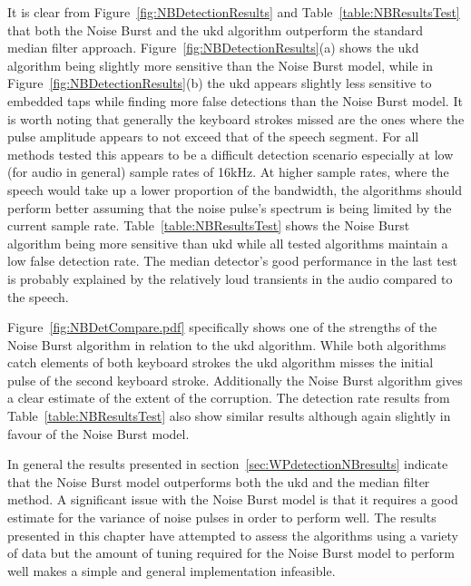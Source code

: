 It is clear from Figure~\ref{fig:NBDetectionResults} and Table~\ref{table:NBResultsTest} that both the Noise Burst and the \gls{ukd} algorithm outperform the standard median filter approach. Figure~\ref{fig:NBDetectionResults}(a) shows the \gls{ukd} algorithm being slightly more sensitive than the Noise Burst model, while in Figure~\ref{fig:NBDetectionResults}(b) the \gls{ukd} appears slightly less sensitive to embedded taps while finding more false detections than the Noise Burst model. It is worth noting that generally the keyboard strokes missed are the ones where the pulse amplitude appears to not exceed that of the speech segment. For all methods tested this appears to be a difficult detection scenario especially at low (for audio in general) sample rates of 16kHz. At higher sample rates, where the speech would take up a lower proportion of the bandwidth, the algorithms should perform better assuming that the noise pulse's spectrum is being limited by the current sample rate. Table~\ref{table:NBResultsTest} shows the Noise Burst algorithm being more sensitive than \gls{ukd} while all tested algorithms maintain a low false detection rate. The median detector's good performance in the last test is probably explained by the relatively loud transients in the audio compared to the speech.

Figure~\ref{fig:NBDetCompare.pdf} specifically shows one of the strengths of the Noise Burst algorithm in relation to the \gls{ukd} algorithm. While both algorithms catch elements of both keyboard strokes the \gls{ukd} algorithm misses the initial pulse of the second keyboard stroke. Additionally the Noise Burst algorithm gives a clear estimate of the extent of the corruption. The detection rate results from Table~\ref{table:NBResultsTest} also show similar results although again slightly in favour of the Noise Burst model.

In general the results presented in section~\ref{sec:WPdetectionNBresults} indicate that the Noise Burst model outperforms both the \gls{ukd} and the median filter method. A significant issue with the Noise Burst model is that it requires a good estimate for the variance of noise pulses in order to perform well. The results presented in this chapter have attempted to assess the algorithms using a variety of data but the amount of tuning required for the Noise Burst model to perform well makes a simple and general implementation infeasible.

